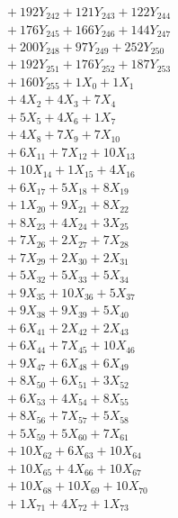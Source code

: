 \documentclass[a4paper,10pt]{article}
\begin{document}
{\begin{align}
&\;  + 192 Y_{242} + 121 Y_{243} + 122 Y_{244} \\[0.3ex]
&\;  + 176 Y_{245} + 166 Y_{246} + 144 Y_{247} \\[0.3ex]
&\;  + 200 Y_{248} + 97 Y_{249} + 252 Y_{250} \\[0.3ex]
&\;  + 192 Y_{251} + 176 Y_{252} + 187 Y_{253} \\[0.3ex]
&\;  + 160 Y_{255} + 1 X_{0} + 1 X_{1} \\[0.3ex]
&\;  + 4 X_{2} + 4 X_{3} + 7 X_{4} \\[0.3ex]
&\;  + 5 X_{5} + 4 X_{6} + 1 X_{7} \\[0.3ex]
&\;  + 4 X_{8} + 7 X_{9} + 7 X_{10} \\[0.3ex]
&\;  + 6 X_{11} + 7 X_{12} + 10 X_{13} \\[0.5ex]\allowbreak
&\;  + 10 X_{14} + 1 X_{15} + 4 X_{16} \\[0.3ex]
&\;  + 6 X_{17} + 5 X_{18} + 8 X_{19} \\[0.3ex]
&\;  + 1 X_{20} + 9 X_{21} + 8 X_{22} \\[0.3ex]
&\;  + 8 X_{23} + 4 X_{24} + 3 X_{25} \\[0.3ex]
&\;  + 7 X_{26} + 2 X_{27} + 7 X_{28} \\[0.3ex]
&\;  + 7 X_{29} + 2 X_{30} + 2 X_{31} \\[0.3ex]
&\;  + 5 X_{32} + 5 X_{33} + 5 X_{34} \\[0.3ex]
&\;  + 9 X_{35} + 10 X_{36} + 5 X_{37} \\[0.3ex]
&\;  + 9 X_{38} + 9 X_{39} + 5 X_{40} \\[0.3ex]
&\;  + 6 X_{41} + 2 X_{42} + 2 X_{43} \\[0.5ex]\allowbreak
&\;  + 6 X_{44} + 7 X_{45} + 10 X_{46} \\[0.3ex]
&\;  + 9 X_{47} + 6 X_{48} + 6 X_{49} \\[0.3ex]
&\;  + 8 X_{50} + 6 X_{51} + 3 X_{52} \\[0.3ex]
&\;  + 6 X_{53} + 4 X_{54} + 8 X_{55} \\[0.3ex]
&\;  + 8 X_{56} + 7 X_{57} + 5 X_{58} \\[0.3ex]
&\;  + 5 X_{59} + 5 X_{60} + 7 X_{61} \\[0.3ex]
&\;  + 10 X_{62} + 6 X_{63} + 10 X_{64} \\[0.3ex]
&\;  + 10 X_{65} + 4 X_{66} + 10 X_{67} \\[0.3ex]
&\;  + 10 X_{68} + 10 X_{69} + 10 X_{70} \\[0.3ex]
&\;  + 1 X_{71} + 4 X_{72} + 1 X_{73} \\[0.5ex]\allowbreak

\end{align}}
\end{document}
